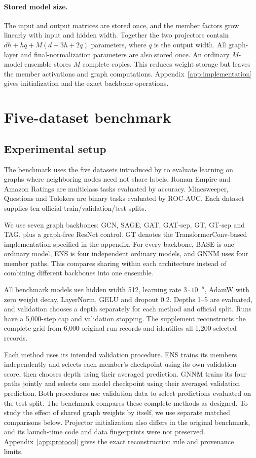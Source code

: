 \documentclass{article}
\begin{document}
\paragraph{Stored model size.}
The input and output matrices are stored once, and the member factors grow linearly with input and hidden width. Together the two projectors contain $dh+hq+M(d+3h+2q)$ parameters, where $q$ is the output width. All graph-layer and final-normalization parameters are also stored once. An ordinary $M$-model ensemble stores $M$ complete copies. This reduces weight storage but leaves the member activations and graph computations. Appendix~\ref{app:implementation} gives initialization and the exact backbone operations.

\section{Five-dataset benchmark}\label{sec:original-benchmark}
\subsection{Experimental setup}
The benchmark uses the five datasets introduced by \citet{platonov2023critical} to evaluate learning on graphs where neighboring nodes need not share labels. Roman Empire and Amazon Ratings are multiclass tasks evaluated by accuracy. Minesweeper, Questions and Tolokers are binary tasks evaluated by ROC-AUC. Each dataset supplies ten official train/validation/test splits.

We use seven graph backbones: GCN, SAGE, GAT, GAT-sep, GT, GT-sep and TAG, plus a graph-free ResNet control. GT denotes the TransformerConv-based implementation specified in the appendix. For every backbone, BASE is one ordinary model, ENS is four independent ordinary models, and GNNM uses four member paths. This compares sharing within each architecture instead of combining different backbones into one ensemble.

All benchmark models use hidden width 512, learning rate $3\cdot10^{-5}$, AdamW with zero weight decay, LayerNorm, GELU and dropout 0.2. Depths 1--5 are evaluated, and validation chooses a depth separately for each method and official split. Runs have a 5,000-step cap and validation stopping. The supplement reconstructs the complete grid from 6,000 original run records and identifies all 1,200 selected records.

Each method uses its intended validation procedure. ENS trains its members independently and selects each member's checkpoint using its own validation score, then chooses depth using their averaged prediction. GNNM trains its four paths jointly and selects one model checkpoint using their averaged validation prediction. Both procedures use validation data to select predictions evaluated on the test split. The benchmark compares these complete methods as designed. To study the effect of shared graph weights by itself, we use separate matched comparisons below. Projector initialization also differs in the original benchmark, and its launch-time code and data fingerprints were not preserved. Appendix~\ref{app:protocol} gives the exact reconstruction rule and provenance limits.
\end{document}
